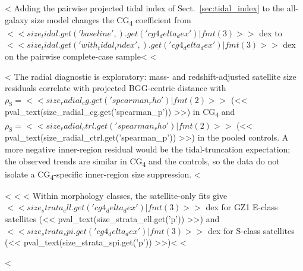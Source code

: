 \documentclass{aa}
\newcommand{\CG}{CG\textsubscript{4}}
\begin{document}
\begin{appendix}
<%
Adding the pairwise projected tidal index of Sect.~\ref{sec:tidal_index} to the all-galaxy size model changes the \CG{} coefficient from \(<< size_tidal.get('baseline', {}).get('cg4_delta_dex')|fmt(3) >>\) dex to \(<< size_tidal.get('with_tidal_index', {}).get('cg4_delta_dex')|fmt(3) >>\) dex on the pairwise complete-case sample<%
<%

<%
The radial diagnostic is exploratory: mass- and redshift-adjusted satellite size residuals correlate with projected BGG-centric distance with \(\rho_\mathrm{S} = << size_radial_cg.get('spearman_rho')|fmt(2) >>\) (<< pval_text(size_radial_cg.get('spearman_p')) >>) in \CG{} and \(\rho_\mathrm{S} = << size_radial_ctrl.get('spearman_rho')|fmt(2) >>\) (<< pval_text(size_radial_ctrl.get('spearman_p')) >>) in the pooled controls. A more negative inner-region residual would be the tidal-truncation expectation; the observed trends are similar in \CG{} and the controls, so the data do not isolate a \CG{}-specific inner-region size suppression.
<%

<%
<%
<%
Within morphology classes, the satellite-only fits give \(<< size_strata_ell.get('cg4_delta_dex')|fmt(3) >>\) dex for GZ1 E-class satellites (<< pval_text(size_strata_ell.get('p')) >>) and \(<< size_strata_spi.get('cg4_delta_dex')|fmt(3) >>\) dex for S-class satellites (<< pval_text(size_strata_spi.get('p')) >>)<%
<%



<%

\end{appendix}
\end{document}
